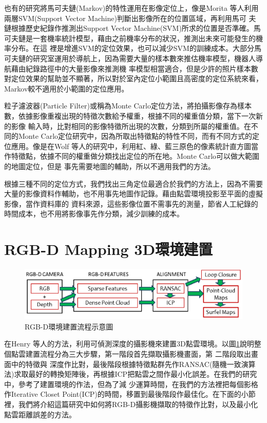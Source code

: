 	也有的研究將馬可夫鏈(Markov)的特性運用在影像定位上，像是Morita 等人\cite{Morita2005}利用兩層SVM(Support Vector Machine)判斷出影像所在的位置區域，再利用馬可
夫鏈根據歷史紀錄作推測出Support Vector Machine(SVM)所求的位置是否準確。馬可夫鏈是一套機率統計模型，藉由之前機率分布的狀況，推測出未來可能發生的機率分布。在這
裡是增進SVM的定位效果，也可以減少SVM的訓練成本。大部分馬可夫鏈的研究室運用於導航上，因為需要大量的樣本數來推估機率模型，機器人導航藉由紀錄路徑中的大量影像來推測機
率模型相當適合，但是少許的照片樣本數對定位效果的幫助並不顯著，所以對於室內定位小範圍且高密度的定位系統來看，Markov較不適用於小範圍的定位應用。

	粒子濾波器(Particle Filter)或稱為Monte Carlo定位方法，將拍攝影像存為樣本數，依據影像重複出現的特徵次數給予權重，根據不同的權重值分類，當下一次新的影像
輸入時，比對相同的影像特徵所出現的次數，分類到所屬的權重值。在不同的Monte Carlo定位研究中，因為所取出特徵點的特性不同，而有不同方式的定位應用。像是在Wolf 
等人的研究中\cite{Wolf2005}，利用紅、綠、藍三原色的像素統計直方圖當作特徵點，依據不同的權重做分類找出定位的所在地。Monte Carlo可以做大範圍的地圖定位，但是
事先需要地圖的輔助，所以不適用我們的方法。

	根據三種不同的定位方式，我們找出三角定位最適合於我們的方法上，因為不需要大量的影像資料作輔助，也不用事先地圖作記錄。藉由點雲環境投影至平面的虛擬影像，當作資料庫的
資料來源，這些影像位置不需事先的測量，節省人工紀錄的時間成本，也不用將影像事先作分類，減少訓練的成本。
	
\section{RGB-D Mapping 3D環境建置}
			
\begin{figure}
\begin{center}
  \includegraphics[width=1.0\textwidth]{figures/RGB-D_System_Overview.eps}
  \caption{RGB-D環境建置流程示意圖}
  \label{fig:RGB-D System}
\end{center}
\end{figure} 
							
	 在Henry 等人\cite{Henry2012}的方法，利用可偵測深度的攝影機來建置3D點雲環境。以圖\ref{fig:RGB-D System}說明整個點雲建置流程分為三大步驟，第一階段首先擷取攝影機畫面，第
二階段取出畫面中的特徵與
深度作比對，最後階段根據特徵點群先作RANSAC(隨機一致演算法)求取最好的轉換矩陣後，再根據ICP把點雲之間作最小化誤差。在我們的研究中，參考了\cite{Henry2012}建置環境的作法，但為了減
少運算時間，在我們的方法裡把每個影格作Iterative Closet Point(ICP)的時間，移置到最後階段作最佳化。在下面的小節裡，我們將介紹這篇研究中如何將RGB-D攝影機擷取的特徵作比對，以及最小化
點雲距離誤差的方法。

